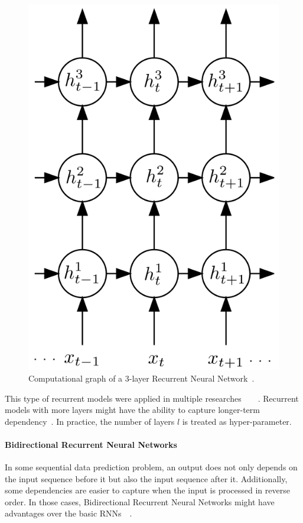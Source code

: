 \begin{figure}[H]
    \centering
    \includegraphics[scale=0.4]{figure/3-layer-lstm}
    \caption[3-layer Recurrent Neural Network]{Computational graph of a 3-layer Recurrent Neural Network~\cite{GravesLSTM}.}
    \label{fig:3-layer-lstm}
\end{figure}

This type of recurrent models were applied in multiple researches~\cite{GravesLSTM}~\cite{SutskeverVL14}~\cite{ZarembaS14}~\cite{treeLSTM}.
Recurrent models with more layers might have the ability to capture longer-term dependency~\cite{treeLSTM}.
In practice, the number of layers \(l\) is treated as hyper-parameter.

\paragraph{Bidirectional Recurrent Neural Networks}\label{sec:bilstm}
In some sequential data prediction problem, an output does not only depends on the input sequence before it but also the input sequence after it. 
Additionally, some dependencies are easier to capture when the input is processed in reverse order.
In those cases, Bidirectional Recurrent Neural Networks might have advantages over the basic RNNs~\cite{GravesLSTM}~\cite{Graves-thesis}.

